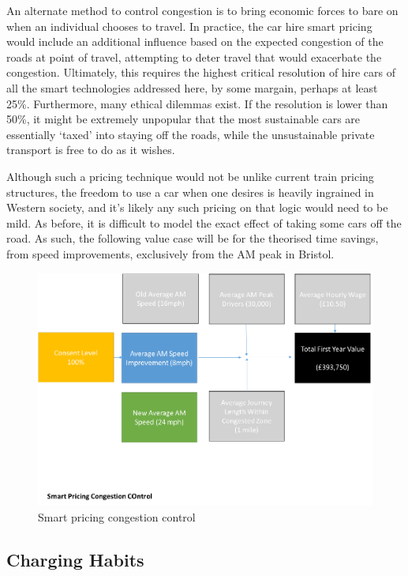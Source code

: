 \documentclass[conference]{IEEEtran}
\begin{document}
An alternate method to control congestion is to bring economic forces
to bare on when an individual chooses to travel. In practice, the car
hire smart pricing would include an additional influence based on the
expected congestion of the roads at point of travel, attempting to
deter travel that would exacerbate the congestion.  Ultimately, this
requires the highest critical resolution of hire cars of all the smart
technologies addressed here, by some margain, perhaps at least
25\%. Furthermore, many ethical dilemmas exist. If the resolution is
lower than 50\%, it might be extremely unpopular that the most
sustainable cars are essentially ‘taxed’ into staying off the roads,
while the unsustainable private transport is free to do as it wishes.

Although such a pricing technique would not be unlike current train
pricing structures, the freedom to use a car when one desires is
heavily ingrained in Western society, and it’s likely any such pricing
on that logic would need to be mild. As before, it is difficult to
model the exact effect of taking some cars off the road. As such, the
following value case will be for the theorised time savings, from
speed improvements, exclusively from the AM peak in Bristol.

\begin{figure}[!htp]
\centering
\includegraphics[width=\columnwidth]{images/smartpricingcc.png}
\caption{Smart pricing congestion control}
\label{fig:smartpricingcc}
\end{figure}

\subsection{Charging Habits}
\end{document}
